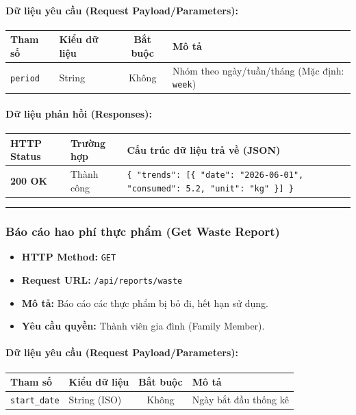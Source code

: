\documentclass[12pt,a4paper]{article}
\begin{document}
\paragraph{Dữ liệu yêu cầu (Request Payload/Parameters):}
\begin{longtable}{|>{\raggedright\arraybackslash}p{2.8cm}|>{\raggedright\arraybackslash}p{2.2cm}|c|>{\raggedright\arraybackslash}p{7.0cm}|}
\hline
\textbf{Tham số} & \textbf{Kiểu dữ liệu} & \textbf{Bắt buộc} & \textbf{Mô tả} \\ \hline
\endhead
\texttt{period} & String & Không & Nhóm theo ngày/tuần/tháng (Mặc định: \texttt{week}) \\ \hline
\end{longtable}

\paragraph{Dữ liệu phản hồi (Responses):}
\begin{longtable}{|>{\raggedright\arraybackslash}p{2.8cm}|>{\raggedright\arraybackslash}p{3.2cm}|>{\raggedright\arraybackslash}p{8.0cm}|}
\hline
\textbf{HTTP Status} & \textbf{Trường hợp} & \textbf{Cấu trúc dữ liệu trả về (JSON)} \\ \hline
\endhead
\textbf{200 OK} & Thành công & \texttt{\{ "trends": [\{ "date": "2026-06-01", "consumed": 5.2, "unit": "kg" \}] \}} \\ \hline
\end{longtable}

\vskip 0.4cm
\noindent\rule{\textwidth}{0.3pt}
\vskip 0.4cm

\subsubsection{Báo cáo hao phí thực phẩm (Get Waste Report)}
\begin{itemize}[leftmargin=*]
    \item \textbf{HTTP Method:} \texttt{GET}
    \item \textbf{Request URL:} \texttt{/api/reports/waste}
    \item \textbf{Mô tả:} Báo cáo các thực phẩm bị bỏ đi, hết hạn sử dụng.
    \item \textbf{Yêu cầu quyền:} Thành viên gia đình (Family Member).
\end{itemize}

\paragraph{Dữ liệu yêu cầu (Request Payload/Parameters):}
\begin{longtable}{|>{\raggedright\arraybackslash}p{2.8cm}|>{\raggedright\arraybackslash}p{2.2cm}|c|>{\raggedright\arraybackslash}p{7.0cm}|}
\hline
\textbf{Tham số} & \textbf{Kiểu dữ liệu} & \textbf{Bắt buộc} & \textbf{Mô tả} \\ \hline
\endhead
\texttt{start\_date} & String (ISO) & Không & Ngày bắt đầu thống kê \\ \hline
\end{longtable}
\end{document}
